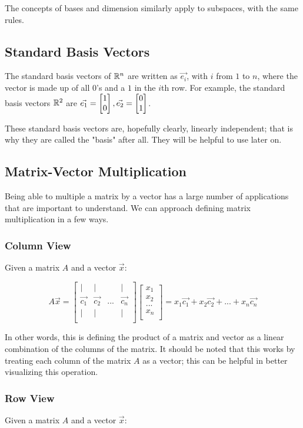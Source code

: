 \documentclass[12pt]{article}
\begin{document}
The concepts of bases and dimension similarly apply to subspaces, with the same rules.

\subsection{Standard Basis Vectors}
The standard basis vectors of $\mathbb{R}^n$ are written as $\Vec{e_i}$, with $i$ from $1$ to $n$, where the vector is made up of all 0's and a $1$ in the $i$th row. For example, the standard basis vectors $\mathbb{R}^2$ are $\Vec{e_1} = \begin{bmatrix} 1\\ 0\\ \end{bmatrix}, \Vec{e_2} = \begin{bmatrix} 0\\ 1\\ \end{bmatrix}$.

These standard basis vectors are, hopefully clearly, linearly independent; that is why they are called the "basis" after all. They will be helpful to use later on.

\subsection{Matrix-Vector Multiplication}
Being able to multiple a matrix by a vector has a large number of applications that are important to understand. We can approach defining matrix multiplication in a few ways.

\subsubsection{Column View}
Given a matrix $A$ and a vector $\Vec{x}$:

\[
A\Vec{x} = \begin{bmatrix}
| &| & &|\\
\Vec{c_1} &\Vec{c_2} &... &\Vec{c_n}\\
| &| & &|\\
\end{bmatrix}\begin{bmatrix}
x_1\\
x_2\\
...\\
x_n\\
\end{bmatrix}=x_1 \Vec{c_1} + x_2 \Vec{c_2} + ... + x_n \Vec{c_n}
\]
 
In other words, this is defining the product of a matrix and vector as a linear combination of the columns of the matrix. It should be noted that this works by treating each column of the matrix $A$ as a vector; this can be helpful in better visualizing this operation.

\subsubsection{Row View}
Given a matrix $A$ and a vector $\Vec{x}$:
\end{document}
